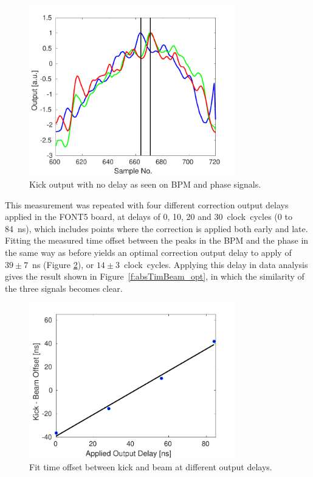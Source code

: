 \begin{figure}
  \centering
  \includegraphics[width=0.8\textwidth]{Figures/commissioning/absTimBeam_d0}
  \caption{Kick output with no delay as seen on BPM and phase signals.}
  \label{f:absTimBeam_d0}
\end{figure}

This measurement was repeated with four different correction output delays applied in the FONT5 board, at delays of 0, 10, 20 and 30~clock~cycles (0 to 84~ns), which includes points where the correction is applied both early and late. Fitting the measured time offset between the peaks in the BPM and the phase in the same way as before yields an optimal correction output delay to apply of \(39\pm7\)~ns (Figure \ref{f:absTimBeam_fit}), or \(14\pm3\)~clock~cycles. Applying this delay in data analysis gives the result shown in Figure~\ref{f:absTimBeam_opt}, in which the similarity of the three signals becomes clear.

\begin{figure}
  \centering
  \includegraphics[width=0.8\textwidth]{Figures/commissioning/absTimBeam_fit}
  \caption{Fit time offset between kick and beam at different output delays.}
  \label{f:absTimBeam_fit}
\end{figure}

